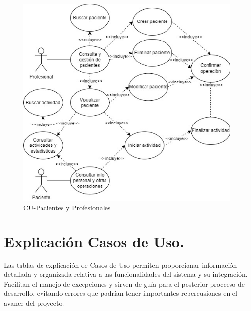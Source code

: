 \begin{figure}[h]
    \centering
    \includegraphics[width=1\textwidth]{img/CUdiagramas/CU-Paciente_Profesional.jpg}
    \caption{CU-Pacientes y Profesionales}
    \label{fig:CU-Paciente_Profesional}
\end{figure}


\section{Explicación Casos de Uso.}
Las tablas de explicación de Casos de Uso permiten proporcionar información detallada y organizada relativa a las funcionalidades del sistema y su integración. Facilitan el manejo de excepciones y sirven de guía para el posterior procceso de desarrollo, evitando errores que podrían tener importantes repercusiones en el avance del proyecto.  

